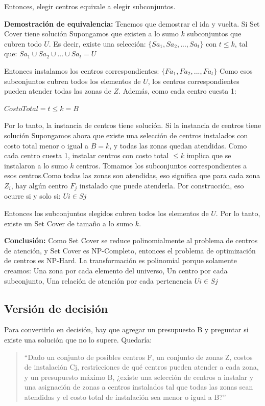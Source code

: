 \documentclass[12pt]{article}
\begin{document}
        Entonces, elegir centros equivale a elegir subconjuntos.

        \textbf{Demostración de equivalencia:} Tenemos que demostrar el ida y vuelta. Si Set Cover tiene solución Supongamos que existen a lo sumo $k$ subconjuntos que cubren todo $U$. Es decir, existe una selección: $\{Sa_1, Sa_2,..., Sa_{t}\}$ con $t \leq k$, tal que: $Sa_1 \cup Sa_2 \cup ... \cup Sa_t = U$

        Entonces instalamos los centros correspondientes: $\{Fa_1, Fa_2,...,Fa_t\}$ Como esos subconjuntos cubren todos los elementos de $U$, los centros correspondientes pueden atender todas las zonas de $Z$. Además, como cada centro cuesta 1:
        \begin{center}
            $Costo Total = t \leq k = B$
        \end{center}
    Por lo tanto, la instancia de centros tiene solución. Si la instancia de centros tiene solución Supongamos ahora que existe una selección de centros instalados con costo total menor o igual a $B = k$, y todas las zonas quedan atendidas. Como cada centro cuesta 1, instalar centros con costo total $\leq k$ implica que se instalaron a lo sumo $k$ centros. Tomamos los subconjuntos correspondientes a esos centros.Como todas las zonas son atendidas, eso significa que para cada zona $Z_i$, hay algún centro $F_j$ instalado que puede atenderla. Por construcción, eso ocurre si y solo si: $Ui \in Sj$


    Entonces los subconjuntos elegidos cubren todos los elementos de $U$. Por lo tanto, existe un Set Cover de tamaño a lo sumo $k$.

            \textbf{Conclusión:} Como Set Cover se reduce polinomialmente al problema de centros de atención, y Set Cover es NP-Completo, entonces el problema de optimización de centros es NP-Hard. La transformación es polinomial porque solamente creamos: Una zona por cada elemento del universo, Un centro por cada subconjunto, Una relación de atención por cada pertenencia $Ui \in Sj$

        \subsection{Versión de decisión}
        
        Para convertirlo en decisión, hay que agregar un presupuesto B y preguntar si existe una solución que no lo supere. Quedaría:
            \begin{quotation}
                “Dado un conjunto de posibles centros F, un conjunto de zonas Z, costos de instalación Cj, restricciones de qué centros pueden atender a cada zona, y un presupuesto máximo B, ¿existe una selección de centros a instalar y una asignación de zonas a centros instalados tal que todas las zonas sean atendidas y el costo total de instalación sea menor o igual a B?”
            \end{quotation}
\end{document}
